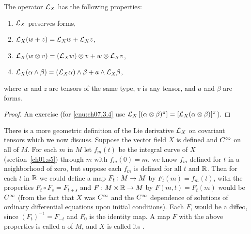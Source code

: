 \documentclass[../main]{subfiles}
\begin{document}
\begin{proposition} \label{prop:ch7.3.1}
The operator $\mathcal{L}_{X}$ has the following properties:

\begin{enumerate}[label = (\arabic*)]
    \item \label{enu:ch07.3.1} $\mathcal{L}_{X}$ preserves forms,
    \item\label{enu:ch07.3.2} $\mathcal{L}_{X}(w+z)=\mathcal{L}_{X} w+\mathcal{L}_{X} z$,
    \item \label{enu:ch07.3.3}$\mathcal{L}_{X}(w \otimes v)=\left(\mathcal{L}_{X} w\right) \otimes v+w \otimes \mathcal{L}_{X} v$,
    \item \label{enu:ch07.3.4}$\mathcal{L}_{X}(\alpha \wedge \beta)=\left(\mathcal{L}_{X} \alpha\right) \wedge \beta+a \wedge \mathcal{L}_{X} \beta$,
\end{enumerate}

where $w$ and $z$ are tensors of the same type, $v$ is any tensor, and $a$ and $\beta$ are forms.
\end{proposition}

\begin{proof}
An exercise (for \ref{enu:ch07.3.4} use $\mathcal{L}_{X}\left[(\alpha \otimes \beta)^\pi\right] = [\mathcal{L}_{X}(\alpha \otimes \beta)]^\pi$).
\end{proof}



There is a more geometric definition of the Lie derivative $\mathcal{L}_{X}$ on covariant tensors which we now discuss. Suppose the vector field $X$ is defined and $C^\infty$ on all of $M$. For each $m$ in $M$ let $f_{m}(t)$ be the integral curve of $X$ (section~\ref{ch01:s5}) through $m$ with $f_{m}(0)=m$. we know $f_{m}$ defined for $t$ in a neighborhood of zero, but suppose each $f_{m}$ is defined for all $t$ and $\mathbb{R}$. Then for each $t$ in $\mathbb{R}$ we could define a map $F_{t}: M \to M$ by $F_{t}(m)=f_{m}(t)$, with the properties $F_{t} \circ F_{s}=F_{t+s}$ and $F: M \times \mathbb{R} \to M$ by $F(m, t)=F_{t}(m)$ would be $C^\infty$ (from the fact that $X$ was $C^\infty$ and the $C^\infty$ dependence of solutions of ordinary differential equations upon initial conditions). Each $F$, would be a diffeo, since $\left(F_{t}\right)^{-1}=F_{-t}$ and $F_{0}$ is the identity map. A map $F$ with the above properties is called a  of $M$, and $X$ is called its .
\end{document}
